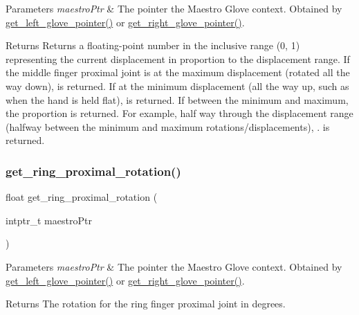\begin{DoxyParams}{Parameters}
{\em maestro\+Ptr} & The pointer the Maestro Glove context. Obtained by \hyperlink{group__glove_management_ga63ce3c99d4a8b8db851b22af9185764e}{get\+\_\+left\+\_\+glove\+\_\+pointer()} or \hyperlink{group__glove_management_ga9b8fd9d91aeac3f8da50f7a7eba0c32b}{get\+\_\+right\+\_\+glove\+\_\+pointer()}. \\
\hline
\end{DoxyParams}
\begin{DoxyReturn}{Returns}
Returns a floating-\/point number in the inclusive range {\ttfamily (0, 1)} representing the current displacement in proportion to the displacement range. If the middle finger proximal joint is at the maximum displacement (rotated all the way down), {} is returned. If at the minimum displacement (all the way up, such as when the hand is held flat), {} is returned. If between the minimum and maximum, the proportion is returned. For example, half way through the displacement range (halfway between the minimum and maximum rotations/displacements), {.} is returned. 
\end{DoxyReturn}
\mbox{\label{group__rotation_access_ga2941894deaa99df80b74f33c824bbb07}} 
\subsubsection{\texorpdfstring{get\+\_\+ring\+\_\+proximal\+\_\+rotation()}{get\_ring\_proximal\_rotation()}}
{\footnotesize\ttfamily float get\+\_\+ring\+\_\+proximal\+\_\+rotation (\begin{DoxyParamCaption}\item[{intptr\+\_\+t}]{maestro\+Ptr }\end{DoxyParamCaption})}


\begin{DoxyParams}{Parameters}
{\em maestro\+Ptr} & The pointer the Maestro Glove context. Obtained by \hyperlink{group__glove_management_ga63ce3c99d4a8b8db851b22af9185764e}{get\+\_\+left\+\_\+glove\+\_\+pointer()} or \hyperlink{group__glove_management_ga9b8fd9d91aeac3f8da50f7a7eba0c32b}{get\+\_\+right\+\_\+glove\+\_\+pointer()}. \\
\hline
\end{DoxyParams}
\begin{DoxyReturn}{Returns}
The rotation for the ring finger proximal joint in degrees. 
\end{DoxyReturn}
\mbox{\label{group__rotation_access_gaf6dfb65e74ed572e79a082d42e53157f}} 

